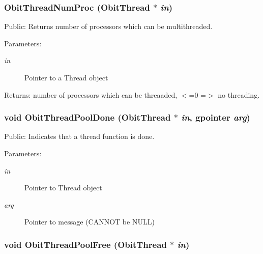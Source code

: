 \subsubsection{ Obit\-Thread\-Num\-Proc ({\bf Obit\-Thread} $\ast$ {\em in})}\label{ObitThread_8h_a20}


Public: Returns number of processors which can be multithreaded. 

\begin{Desc}
\item[Parameters:]
\begin{description}
\item[{\em in}]Pointer to a Thread object \end{description}
\end{Desc}
\begin{Desc}
\item[Returns:]number of processors which can be threaaded, $<$=0 =$>$ no threading. \end{Desc}
\subsubsection{\setlength{\rightskip}{0pt plus 5cm}void Obit\-Thread\-Pool\-Done ({\bf Obit\-Thread} $\ast$ {\em in}, gpointer {\em arg})}\label{ObitThread_8h_a23}


Public: Indicates that a thread function is done. 

\begin{Desc}
\item[Parameters:]
\begin{description}
\item[{\em in}]Pointer to Thread object \item[{\em arg}]Pointer to message (CANNOT be NULL) \end{description}
\end{Desc}
\subsubsection{\setlength{\rightskip}{0pt plus 5cm}void Obit\-Thread\-Pool\-Free ({\bf Obit\-Thread} $\ast$ {\em in})}\label{ObitThread_8h_a24}


